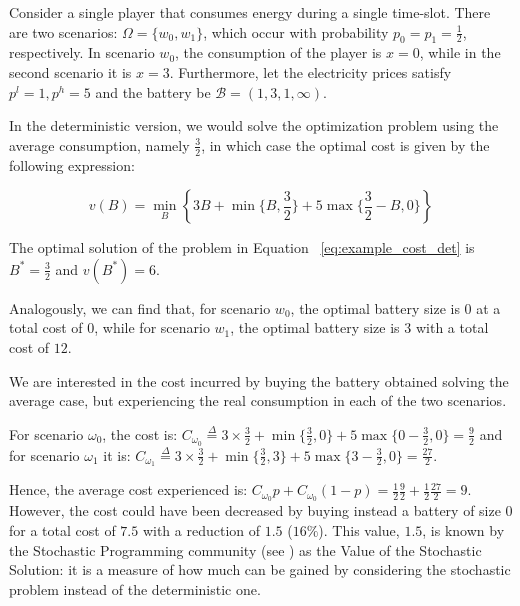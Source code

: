 \documentclass[sigconf, table]{acmart}
\newcommand{\Bat}{\mathcal{B}}
\begin{document}
\begin{example}\label{ex:stoc_example}

Consider a single player that consumes energy during a single time-slot. There are two scenarios: $\Omega = \{ w_0, w_1\}$, which occur with probability $p_0 = p_1 = \frac 1 2$, respectively.
In scenario $w_0$, the consumption of the player is $x = 0$, while in the second scenario it is $x = 3$. Furthermore, let the electricity prices satisfy $p^l = 1, p^h = 5$ and the battery be $\Bat = (1, 3, 1, \infty)$.

In the deterministic version, we would solve the optimization problem using the average consumption, namely $\frac 3 2$, in which case the optimal cost is given by the following expression:

\begin{equation}\label{eq:example_cost_det}
  v(B) = \min_B \left\{3B + \min\{ B, \frac 3 2\} + 5\max\{\frac 3 2 - B, 0\} \right\}
\end{equation}

The optimal solution of the problem in Equation ~\ref{eq:example_cost_det} is $B^*=\frac 3 2$  and $v(B^*) = 6$.

Analogously, we can find that, for scenario $w_0$, the optimal battery size is $0$ at a total cost of $0$, while for scenario $w_1$, the optimal battery size is $3$ with a total cost of $12$.

We are interested in the cost incurred by buying the battery obtained solving the average case, but experiencing the real consumption in each of the two scenarios.

For scenario $\omega_0$, the cost is: $C_{\omega_0} \overset{\Delta}{=} 3 \times \frac 3 2 + \min\{\frac 3 2, 0\} + 5\max\{0 - \frac 3 2, 0\} = \frac 9 2 $
and for scenario $\omega_1$ it is: $C_{\omega_1} \overset{\Delta}{=} 3 \times  \frac 3 2 + \min\{\frac 3 2, 3\} + 5\max\{3 - \frac3 2, 0\} = \frac{27}{2}$.

Hence, the average cost experienced is: $C_{\omega_0}p + C_{\omega_0}(1-p) = \frac{1}{2}\frac{9}{2} + \frac{1}{2}\frac{27}{2} = 9$. However, the cost could have been decreased by buying instead a battery of size $0$ for a total cost of $7.5$ with a reduction of $1.5$ ($16\%$). This value, $1.5$, is known by the Stochastic Programming community (see \cite{kall1994stochastic}) as the Value of the Stochastic Solution: it is a measure of how much can be gained by considering the stochastic problem instead of the deterministic one.




\end{example}
\end{document}
